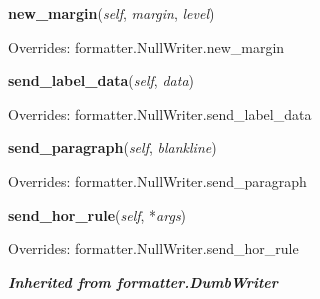     \vspace{0.5ex}

\hspace{.8\funcindent}\begin{boxedminipage}{\funcwidth}

    \raggedright \textbf{new\_margin}(\textit{self}, \textit{margin}, \textit{level})

\setlength{\parskip}{2ex}
\setlength{\parskip}{1ex}
      Overrides: formatter.NullWriter.new\_margin

    \end{boxedminipage}

    \vspace{0.5ex}

\hspace{.8\funcindent}\begin{boxedminipage}{\funcwidth}

    \raggedright \textbf{send\_label\_data}(\textit{self}, \textit{data})

\setlength{\parskip}{2ex}
\setlength{\parskip}{1ex}
      Overrides: formatter.NullWriter.send\_label\_data

    \end{boxedminipage}

    \vspace{0.5ex}

\hspace{.8\funcindent}\begin{boxedminipage}{\funcwidth}

    \raggedright \textbf{send\_paragraph}(\textit{self}, \textit{blankline})

\setlength{\parskip}{2ex}
\setlength{\parskip}{1ex}
      Overrides: formatter.NullWriter.send\_paragraph

    \end{boxedminipage}

    \vspace{0.5ex}

\hspace{.8\funcindent}\begin{boxedminipage}{\funcwidth}

    \raggedright \textbf{send\_hor\_rule}(\textit{self}, *\textit{args})

\setlength{\parskip}{2ex}
\setlength{\parskip}{1ex}
      Overrides: formatter.NullWriter.send\_hor\_rule

    \end{boxedminipage}


\large{\textbf{\textit{Inherited from formatter.DumbWriter}}}


